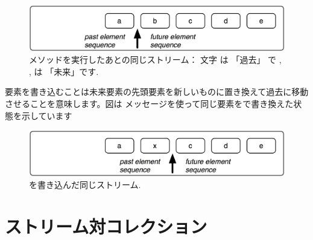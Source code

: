 \documentclass[a4paper,10pt,twoside]{book}
\begin{document}
\begin{figure}[ht]
\centerline{\includegraphics[scale=0.5]{a_bcdeStef}}
\caption{メソッドを実行したあとの同じストリーム： 文字  は 「過去」 で , ,   は 「未来」です.}
\vspace{.2in}
\end{figure}

要素を書き込むことは未来要素の先頭要素を新しいものに置き換えて過去に移動させることを意味します。図は メッセージを使って同じ要素をで書き換えた状態を示しています


\begin{figure}[h!t]
\centerline{\includegraphics[scale=0.5]{ax_cdeStef}}
\caption{を書き込んだ同じストリーム.}
\vspace{.2in}
\end{figure}

\section{ストリーム対コレクション}
\end{document}
